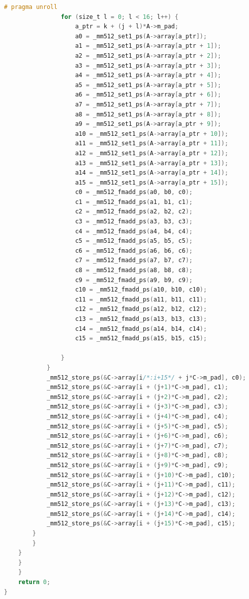 \documentclass{article}
\begin{document}
\begin{lstlisting}[language=C,breaklines=true,basicstyle=\small,caption={AVX-512},captionpos=b]
                # pragma unroll
                for (size_t l = 0; l < 16; l++) {
                    a_ptr = k + (j + l)*A->m_pad;
                    a0 = _mm512_set1_ps(A->array[a_ptr]);
                    a1 = _mm512_set1_ps(A->array[a_ptr + 1]);
                    a2 = _mm512_set1_ps(A->array[a_ptr + 2]);
                    a3 = _mm512_set1_ps(A->array[a_ptr + 3]);
                    a4 = _mm512_set1_ps(A->array[a_ptr + 4]);
                    a5 = _mm512_set1_ps(A->array[a_ptr + 5]);
                    a6 = _mm512_set1_ps(A->array[a_ptr + 6]);
                    a7 = _mm512_set1_ps(A->array[a_ptr + 7]);
                    a8 = _mm512_set1_ps(A->array[a_ptr + 8]);
                    a9 = _mm512_set1_ps(A->array[a_ptr + 9]);
                    a10 = _mm512_set1_ps(A->array[a_ptr + 10]);
                    a11 = _mm512_set1_ps(A->array[a_ptr + 11]);
                    a12 = _mm512_set1_ps(A->array[a_ptr + 12]);
                    a13 = _mm512_set1_ps(A->array[a_ptr + 13]);
                    a14 = _mm512_set1_ps(A->array[a_ptr + 14]);
                    a15 = _mm512_set1_ps(A->array[a_ptr + 15]);
                    c0 = _mm512_fmadd_ps(a0, b0, c0);
                    c1 = _mm512_fmadd_ps(a1, b1, c1);
                    c2 = _mm512_fmadd_ps(a2, b2, c2);
                    c3 = _mm512_fmadd_ps(a3, b3, c3);
                    c4 = _mm512_fmadd_ps(a4, b4, c4);
                    c5 = _mm512_fmadd_ps(a5, b5, c5);
                    c6 = _mm512_fmadd_ps(a6, b6, c6);
                    c7 = _mm512_fmadd_ps(a7, b7, c7);
                    c8 = _mm512_fmadd_ps(a8, b8, c8);
                    c9 = _mm512_fmadd_ps(a9, b9, c9);
                    c10 = _mm512_fmadd_ps(a10, b10, c10);
                    c11 = _mm512_fmadd_ps(a11, b11, c11);
                    c12 = _mm512_fmadd_ps(a12, b12, c12);
                    c13 = _mm512_fmadd_ps(a13, b13, c13);
                    c14 = _mm512_fmadd_ps(a14, b14, c14);
                    c15 = _mm512_fmadd_ps(a15, b15, c15);
                    
                }
            }
            _mm512_store_ps(&C->array[i/*:i+15*/ + j*C->m_pad], c0);
            _mm512_store_ps(&C->array[i + (j+1)*C->m_pad], c1);
            _mm512_store_ps(&C->array[i + (j+2)*C->m_pad], c2);
            _mm512_store_ps(&C->array[i + (j+3)*C->m_pad], c3);
            _mm512_store_ps(&C->array[i + (j+4)*C->m_pad], c4);
            _mm512_store_ps(&C->array[i + (j+5)*C->m_pad], c5);
            _mm512_store_ps(&C->array[i + (j+6)*C->m_pad], c6);
            _mm512_store_ps(&C->array[i + (j+7)*C->m_pad], c7);
            _mm512_store_ps(&C->array[i + (j+8)*C->m_pad], c8);
            _mm512_store_ps(&C->array[i + (j+9)*C->m_pad], c9);
            _mm512_store_ps(&C->array[i + (j+10)*C->m_pad], c10);
            _mm512_store_ps(&C->array[i + (j+11)*C->m_pad], c11);
            _mm512_store_ps(&C->array[i + (j+12)*C->m_pad], c12);
            _mm512_store_ps(&C->array[i + (j+13)*C->m_pad], c13);
            _mm512_store_ps(&C->array[i + (j+14)*C->m_pad], c14);
            _mm512_store_ps(&C->array[i + (j+15)*C->m_pad], c15);
        }
        }
    }                          
    }
    }
    return 0;
}
\end{lstlisting}
\end{document}
